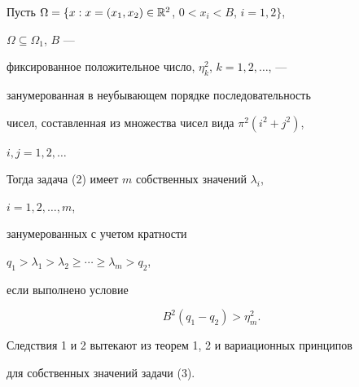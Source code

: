  


\begin{cor} 


Пусть $\Omega=\{x:x=(x_1,x_2)\in\Bbb R^2$, $0<x_i<B$, $i=1,2\}$, 


$\Omega\subseteq\Omega_1$, $B$ --- 


фиксированное положительное число, $\eta^2_k$, $k=1,2,\dotsc$, --- 


занумерованная в неубывающем порядке последовательность 


чисел, составленная из множества чисел вида $\pi^2(i^2+j^2)$, 


$i,j=1,2,\dotsc$ 


Тогда задача (2) имеет $m$ собственных значений $\lambda_i$, 


$i=1,2,\dotsc,m$, 


занумерованных с учетом кратности 


$q_1>\lambda_1>\lambda_2\ge\dotsb\ge\lambda_m>q_2$, 


если выполнено условие 


$$ 


B^2(q_1-q_2)>\eta^2_m. 


$$ 


\end{cor} 


 


Следствия 1 и 2 вытекают из теорем 1, 2 и вариационных принципов 


для собственных значений задачи (3). 


 


 


